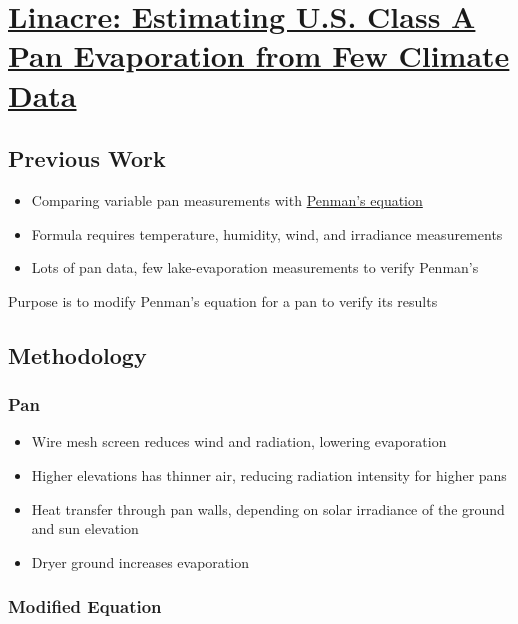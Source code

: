 \documentclass{article}
\begin{document}
\newpage

\section{\href{https://deepcreekanswers.com/deepcreekscience/documents/evaporation/Penpan.pdf}{Linacre: Estimating U.S. Class A Pan Evaporation from Few Climate Data}}

\subsection{Previous Work}

\begin{itemize}
    \item Comparing variable pan measurements with \href{https://en.wikipedia.org/wiki/Penman_equation}{Penman’s equation}
    \item Formula requires temperature, humidity, wind, and irradiance measurements
    \item Lots of pan data, few lake-evaporation measurements to verify Penman’s
\end{itemize}

Purpose is to modify Penman’s equation for a pan to verify its results

\subsection{Methodology}

\subsubsection{Pan}

\begin{itemize}
    \item Wire mesh screen reduces wind and radiation, lowering evaporation
    \item Higher elevations has thinner air, reducing radiation intensity for higher pans
    \item Heat transfer through pan walls, depending on solar irradiance of the ground and sun elevation
    \item Dryer ground increases evaporation
\end{itemize}

\subsubsection{Modified Equation}
\end{document}
